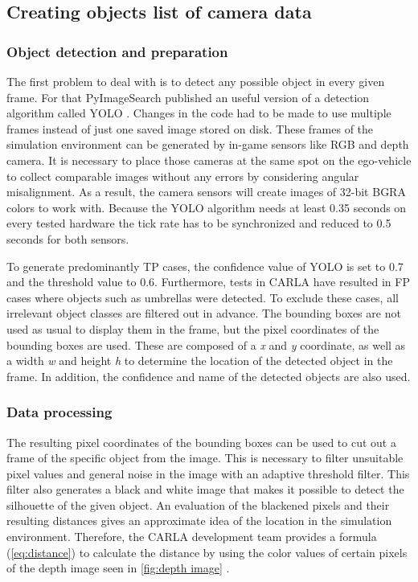 \subsection{Creating objects list of camera data}\label{C}
\subsubsection{Object detection and preparation}
The first problem to deal with is to detect any possible object in every given frame. For that PyImageSearch published an useful version of a detection algorithm called \ac{YOLO} \cite{Yolo}. 
Changes in the code had to be made to use multiple frames instead of just one saved image stored on disk.
These frames of the simulation environment can be generated by in-game sensors like RGB and depth camera. It is necessary to place those cameras at the same spot on the ego-vehicle to collect comparable images without any errors by considering angular misalignment. As a result, the camera sensors will create images of 32-bit BGRA colors to work with. 
Because the \ac{YOLO} algorithm needs at least 0.35 seconds on every tested hardware the tick rate has to be synchronized and reduced to 0.5 seconds for both sensors.

To generate predominantly \ac{TP} cases, the confidence value of \ac{YOLO} is set to 0.7 and the threshold value to 0.6. Furthermore, tests in CARLA have resulted in \ac{FP} cases where objects such as umbrellas were detected. To exclude these cases, all irrelevant object classes are filtered out in advance. The bounding boxes are not used as usual to display them in the frame, but the pixel coordinates of the bounding boxes are used. These are composed of a \textit{x} and \textit{y} coordinate, as well as a width \textit{w} and height \textit{h} to determine the location of the detected object in the frame. In addition, the confidence and name of the detected objects are also used. 
\subsubsection{Data processing}
The resulting pixel coordinates of the bounding boxes can be used to cut out a frame of the specific object from the image. This is necessary to filter unsuitable pixel values and general noise in the image with an adaptive threshold filter. This filter also generates a black and white image that makes it possible to detect the silhouette of the given object. An evaluation of the blackened pixels and their resulting distances gives an approximate idea of the location in the simulation environment.
Therefore, the CARLA development team provides a formula (\cref{eq:distance}) to calculate the distance by using the color values of certain pixels of the depth image seen in \cref{fig:depth image} \cite{distance}. 

